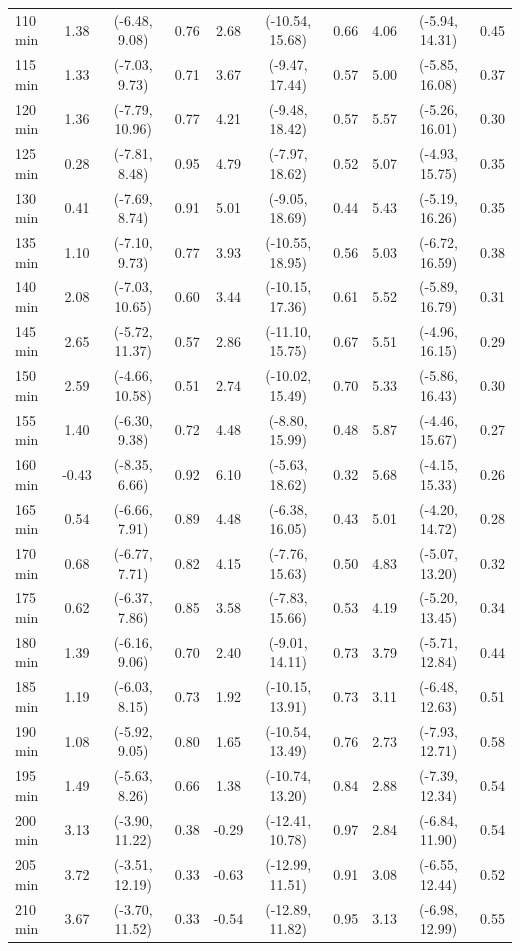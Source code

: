 \begin{table}[ht]
{\begin{tabular}{lccccccccc}
110 min & 1.38 & (-6.48, 9.08) & 0.76 & 2.68 & (-10.54, 15.68) & 0.66 & 4.06 & (-5.94, 14.31) & 0.45 \\
115 min & 1.33 & (-7.03, 9.73) & 0.71 & 3.67 & (-9.47, 17.44) & 0.57 & 5.00 & (-5.85, 16.08) & 0.37 \\
120 min & 1.36 & (-7.79, 10.96) & 0.77 & 4.21 & (-9.48, 18.42) & 0.57 & 5.57 & (-5.26, 16.01) & 0.30 \\
125 min & 0.28 & (-7.81, 8.48) & 0.95 & 4.79 & (-7.97, 18.62) & 0.52 & 5.07 & (-4.93, 15.75) & 0.35 \\
130 min & 0.41 & (-7.69, 8.74) & 0.91 & 5.01 & (-9.05, 18.69) & 0.44 & 5.43 & (-5.19, 16.26) & 0.35 \\
135 min & 1.10 & (-7.10, 9.73) & 0.77 & 3.93 & (-10.55, 18.95) & 0.56 & 5.03 & (-6.72, 16.59) & 0.38 \\
140 min & 2.08 & (-7.03, 10.65) & 0.60 & 3.44 & (-10.15, 17.36) & 0.61 & 5.52 & (-5.89, 16.79) & 0.31 \\
145 min & 2.65 & (-5.72, 11.37) & 0.57 & 2.86 & (-11.10, 15.75) & 0.67 & 5.51 & (-4.96, 16.15) & 0.29 \\
150 min & 2.59 & (-4.66, 10.58) & 0.51 & 2.74 & (-10.02, 15.49) & 0.70 & 5.33 & (-5.86, 16.43) & 0.30 \\
155 min & 1.40 & (-6.30, 9.38) & 0.72 & 4.48 & (-8.80, 15.99) & 0.48 & 5.87 & (-4.46, 15.67) & 0.27 \\
160 min & -0.43 & (-8.35, 6.66) & 0.92 & 6.10 & (-5.63, 18.62) & 0.32 & 5.68 & (-4.15, 15.33) & 0.26 \\
165 min & 0.54 & (-6.66, 7.91) & 0.89 & 4.48 & (-6.38, 16.05) & 0.43 & 5.01 & (-4.20, 14.72) & 0.28 \\
170 min & 0.68 & (-6.77, 7.71) & 0.82 & 4.15 & (-7.76, 15.63) & 0.50 & 4.83 & (-5.07, 13.20) & 0.32 \\
175 min & 0.62 & (-6.37, 7.86) & 0.85 & 3.58 & (-7.83, 15.66) & 0.53 & 4.19 & (-5.20, 13.45) & 0.34 \\
180 min & 1.39 & (-6.16, 9.06) & 0.70 & 2.40 & (-9.01, 14.11) & 0.73 & 3.79 & (-5.71, 12.84) & 0.44 \\
185 min & 1.19 & (-6.03, 8.15) & 0.73 & 1.92 & (-10.15, 13.91) & 0.73 & 3.11 & (-6.48, 12.63) & 0.51 \\
190 min & 1.08 & (-5.92, 9.05) & 0.80 & 1.65 & (-10.54, 13.49) & 0.76 & 2.73 & (-7.93, 12.71) & 0.58 \\
195 min & 1.49 & (-5.63, 8.26) & 0.66 & 1.38 & (-10.74, 13.20) & 0.84 & 2.88 & (-7.39, 12.34) & 0.54 \\
200 min & 3.13 & (-3.90, 11.22) & 0.38 & -0.29 & (-12.41, 10.78) & 0.97 & 2.84 & (-6.84, 11.90) & 0.54 \\
205 min & 3.72 & (-3.51, 12.19) & 0.33 & -0.63 & (-12.99, 11.51) & 0.91 & 3.08 & (-6.55, 12.44) & 0.52 \\
210 min & 3.67 & (-3.70, 11.52) & 0.33 & -0.54 & (-12.89, 11.82) & 0.95 & 3.13 & (-6.98, 12.99) & 0.55 \\
\bottomrule
\end{tabular}%
}
\end{table}

